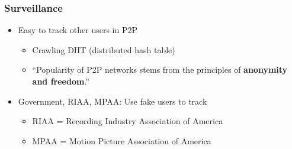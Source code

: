 \documentclass[mathserif,serif,14pt,aspectratio=169]{beamer}
\begin{document}
\begin{frame}
	\frametitle{Surveillance}
	\begin{itemize}\setlength\itemsep{0.5em}
	\item<2-> Easy to track other users in P2P
		\begin{itemize}\setlength\itemsep{0.3em}
		\item<2-> Crawling DHT (distributed hash table)
		\item<3-> ``Popularity of P2P networks stems from the principles of
				 \textbf{anonymity and freedom}.'' \nocite{37_1698430}
		\end{itemize}
	\item<4-> Government, RIAA, MPAA: Use fake users to track
		\begin{itemize}\setlength\itemsep{0.3em}
		\item<4-> RIAA = Recording Industry Association of America
		\item<4-> MPAA = Motion Picture Association of America
		\end{itemize}
	\end{itemize}
\end{frame}
\end{document}
